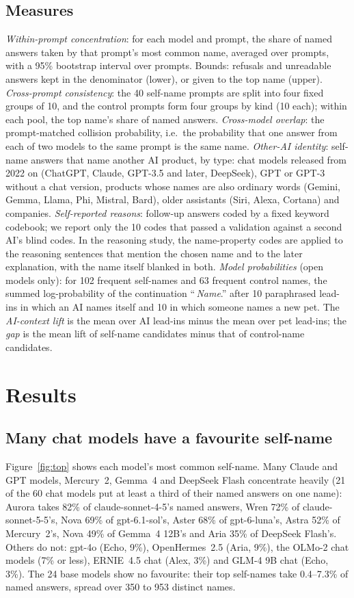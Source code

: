 \documentclass[11pt]{article}
\begin{document}
\subsection{Measures}
\emph{Within-prompt concentration}: for each model and prompt, the share of named answers taken by that prompt's
most common name, averaged over prompts, with a 95\% bootstrap interval over prompts. Bounds: refusals and unreadable
answers kept in the denominator (lower), or given to the top name (upper).
\emph{Cross-prompt consistency}: the 40 self-name prompts are split into four fixed groups of 10, and the control
prompts form four groups by kind (10 each); within each pool, the top name's share of named answers.
\emph{Cross-model overlap}: the prompt-matched collision probability, i.e.\ the probability that one answer from each
of two models to the same prompt is the same name.
\emph{Other-AI identity}: self-name answers that name another AI product, by type: chat models released from 2022 on
(ChatGPT, Claude, GPT-3.5 and later, DeepSeek), GPT or GPT-3 without a chat version, products whose names are also
ordinary words (Gemini, Gemma, Llama, Phi, Mistral, Bard), older assistants (Siri, Alexa, Cortana) and companies.
\emph{Self-reported reasons}: follow-up answers coded by a fixed keyword codebook; we report only the 10 codes that
passed a validation against a second AI's blind codes. In the reasoning study, the name-property codes are applied
to the reasoning sentences that mention the chosen name and to the later explanation, with the name itself blanked
in both.
\emph{Model probabilities} (open models only): for 102 frequent self-names and 63 frequent control names, the summed
log-probability of the continuation ``\,\textit{Name}.'' after 10 paraphrased lead-ins in which an AI names itself and
10 in which someone names a new pet. The \emph{AI-context lift} is the mean over AI lead-ins minus the mean over pet
lead-ins; the \emph{gap} is the mean lift of self-name candidates minus that of control-name candidates.

\section{Results}

\subsection{Many chat models have a favourite self-name}
Figure~\ref{fig:top} shows each model's most common self-name. Many Claude and GPT models, Mercury~2, Gemma~4 and
DeepSeek Flash concentrate heavily (21 of the 60 chat models put at least a third of their named answers on one
name): Aurora takes 82\% of claude-sonnet-4-5's named answers, Wren 72\% of claude-sonnet-5-5's, Nova 69\% of
gpt-6.1-sol's, Aster 68\% of gpt-6-luna's, Astra 52\% of Mercury~2's, Nova 49\% of Gemma~4 12B's and Aria 35\% of
DeepSeek Flash's. Others do not: gpt-4o (Echo, 9\%), OpenHermes~2.5 (Aria, 9\%), the OLMo-2 chat models (7\% or less),
ERNIE~4.5 chat (Alex, 3\%) and GLM-4 9B chat (Echo, 3\%). The 24 base models show no favourite: their top self-names
take 0.4--7.3\% of named answers, spread over 350 to 953 distinct names.
\end{document}
